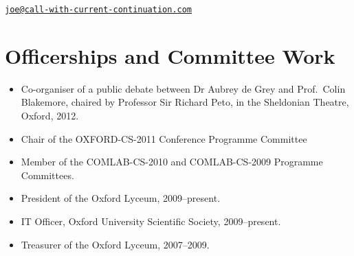 \documentclass[12pt,twoside,letterpaper]{article}
\begin{document}


\vspace{-10mm}


\vspace{-7mm}


\vspace{-6mm}


\vspace{-7mm}


\newpage


\vspace*{-28mm}


\vspace{-7mm}


\vspace{-7mm}


\vspace{-7mm}


\vspace{-7mm}


\vspace{-4.5mm}


\noindent


\newpage


\vspace*{-23mm}\hfill\href{mailto:joe@call-with-current-continuation.com}%
{\nolinkurl{joe@call-with-current-continuation.com}}

\vspace{-3mm}
\section*{Officerships and Committee Work}
\vspace{-2mm}

\begin{itemize}
	\item Co-organiser of a public debate between Dr Aubrey de Grey
		and Prof.\ Colin Blakemore, chaired by Professor Sir Richard
		Peto, in the Sheldonian Theatre, Oxford, 2012.
	\item Chair of the OXFORD-CS-2011 Conference Programme Committee
	\item Member of the COMLAB-CS-2010 and COMLAB-CS-2009 Programme
		Committees.
	\item President of the Oxford Lyceum, 2009--present.
	\item IT Officer, Oxford University Scientific Society, 2009--present.
	\item Treasurer of the Oxford Lyceum, 2007--2009.
\end{itemize}
\end{document}
